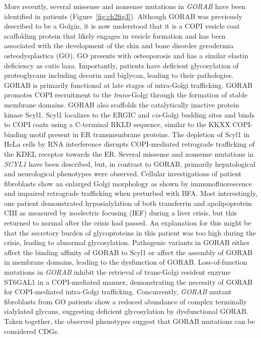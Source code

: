 More recently, several missense and nonsense mutations in \emph{GORAB} have been identified in patients (Figure~\ref{fig:ch2fig3}). Although GORAB was previously described to be a Golgin, it is now understood that it is a COPI vesicle coat scaffolding protein that likely engages in vesicle formation and has been associated with the development of the skin and bone disorder gerodermia osteodysplastica (GO)\cite{witkos_gorab_2019,lowe_physiological_2019,hennies_gerodermia_2008,chan_impaired_2018}. GO presents with osteoporosis and has a similar elastin deficiency as cutis laxa\cite{hunter_geroderma_1978,lisker_gerodermia_1979}. Importantly, patients have deficient glycosylation of proteoglycans including decorin and biglycan, leading to their pathologies. GORAB is primarily functional at late stages of intra-Golgi trafficking. GORAB promotes COPI recruitment to the \emph{trans}-Golgi through the formation of stable membrane domains. GORAB also scaffolds the catalytically inactive protein kinase Scyl1\cite{witkos_gorab_2019}. Scyl1 localizes to the ERGIC and \emph{cis}-Golgi budding sites and binds to COPI coats using a C-terminal RKLD sequence, similar to the KKXX COPI-binding motif present in ER transmembrane proteins. The depletion of Scyl1 in HeLa cells by RNA interference disrupts COPI-mediated retrograde trafficking of the KDEL receptor towards the ER\cite{burman_scyl1_2008}. Several missense and nonsense mutations in \emph{SCYL1} have been described, but, in contrast to GORAB, primarily hepatological and neurological phenotypes were observed\cite{lenz_scyl1_2018,schmidt_mutation_2007,schmidt_disruptive_2015}. Cellular investigations of patient fibroblasts show an enlarged Golgi morphology as shown by immunofluorescence and impaired retrograde trafficking when perturbed with BFA\cite{lenz_scyl1_2018}. Most interestingly, one patient demonstrated hyposialylation of both transferrin and apolipoprotein CIII as measured by isoelectric focusing (IEF) during a liver crisis, but this returned to normal after the crisis had passed\cite{lenz_scyl1_2018}. An explanation for this might be that the secretory burden of glycoproteins in this patient was too high during the crisis, leading to abnormal glycosylation. Pathogenic variants in GORAB either affect the binding affinity of GORAB to Scyl1 or affect the assembly of GORAB in membrane domains, leading to the dysfunction of GORAB. Loss-of-function mutations in \emph{GORAB} inhibit the retrieval of trans-Golgi resident enzyme ST6GAL1 in a COPI-mediated manner, demonstrating the necessity of GORAB for COPI-mediated intra-Golgi trafficking. Concurrently, \emph{GORAB} mutant fibroblasts from GO patients show a reduced abundance of complex terminally sialylated glycans, suggesting deficient glycosylation by dysfunctional GORAB\cite{witkos_gorab_2019}. Taken together, the observed phenotypes suggest that GORAB mutations can be considered CDGs.

